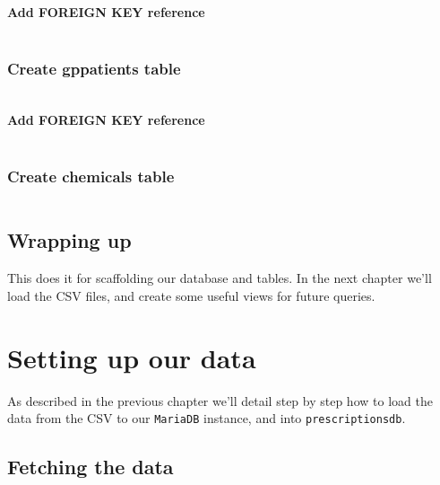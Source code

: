 \documentclass[english,a4paper,]{report}
\begin{document}
\inputminted[firstline=21,lastline=34]{sql}{src/sql/00-setup.sql}

\subsubsection{Add FOREIGN KEY
reference}\label{add-foreign-key-reference}

\inputminted[firstline=36,lastline=36]{sql}{src/sql/00-setup.sql}

\subsection{Create gppatients table}\label{create-gppatients-table}

\inputminted[firstline=43,lastline=46]{sql}{src/sql/00-setup.sql}

\subsubsection{Add FOREIGN KEY
reference}\label{add-foreign-key-reference-1}

\inputminted[firstline=48,lastline=48]{sql}{src/sql/00-setup.sql}

\subsection{Create chemicals table}\label{create-chemicals-table}

\inputminted[firstline=38,lastline=41]{sql}{src/sql/00-setup.sql}

\section{Wrapping up}\label{wrapping-up}

This does it for scaffolding our database and tables. In the next
chapter we'll load the CSV files, and create some useful views for
future queries.

\chapter{Setting up our data}\label{setting-up-our-data}

As described in the previous chapter we'll detail step by step how to
load the data from the CSV to our \texttt{MariaDB} instance, and into
\texttt{prescriptionsdb}.

\section{Fetching the data}\label{fetching-the-data}
\end{document}
